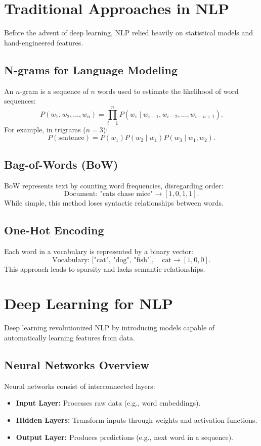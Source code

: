 \documentclass[12pt]{article}
\begin{document}
\section{Traditional Approaches in NLP}
Before the advent of deep learning, NLP relied heavily on statistical models and hand-engineered features.

\subsection{N-grams for Language Modeling}
An \(n\)-gram is a sequence of \(n\) words used to estimate the likelihood of word sequences:
\[
P(w_1, w_2, \ldots, w_n) = \prod_{i=1}^{n} P(w_i \mid w_{i-1}, w_{i-2}, \ldots, w_{i-n+1}).
\]
For example, in trigrams (\(n=3\)):
\[
P(\text{sentence}) = P(w_1) P(w_2 \mid w_1) P(w_3 \mid w_1, w_2).
\]

\subsection{Bag-of-Words (BoW)}
BoW represents text by counting word frequencies, disregarding order:
\[
\text{Document: "cats chase mice"} \to [1, 0, 1, 1].
\]
While simple, this method loses syntactic relationships between words.

\subsection{One-Hot Encoding}
Each word in a vocabulary is represented by a binary vector:
\[
\text{Vocabulary: ["cat", "dog", "fish"]}, \quad \text{cat} \to [1, 0, 0].
\]
This approach leads to sparsity and lacks semantic relationships.

\section{Deep Learning for NLP}
Deep learning revolutionized NLP by introducing models capable of automatically learning features from data.

\subsection{Neural Networks Overview}
Neural networks consist of interconnected layers:
\begin{itemize}
    \item \textbf{Input Layer:} Processes raw data (e.g., word embeddings).
    \item \textbf{Hidden Layers:} Transform inputs through weights and activation functions.
    \item \textbf{Output Layer:} Produces predictions (e.g., next word in a sequence).
\end{itemize}
\end{document}
